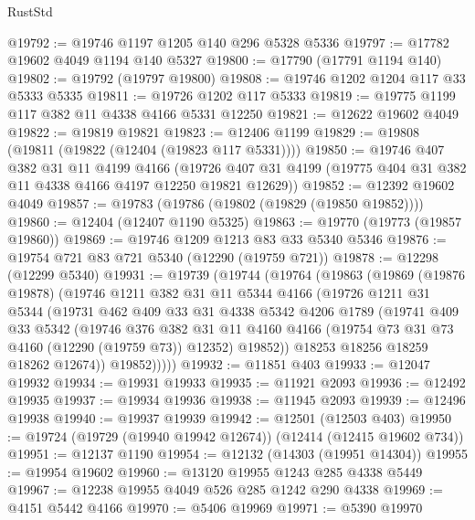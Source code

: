\begin{lexlean}{RustStd}
\begin{coremodule}
{\begin{coremodule}
{{{{{{{{{{{{{{{{{{{{{{{{{{{{{{{{{{{{{{{{{{{{{{{{{{@19792 := @19746 @1197 @1205 @140 @296 @5328 @5336
@19797 := @17782 @19602 @4049 @1194 @140 @5327
@19800 := @17790 (@17791 @1194 @140)
@19802 := @19792 (@19797 @19800)
@19808 := @19746 @1202 @1204 @117 @33 @5333 @5335
@19811 := @19726 @1202 @117 @5333
@19819 := @19775 @1199 @117 @382 @11 @4338 @4166 @5331 @12250
@19821 := @12622 @19602 @4049
@19822 := @19819 @19821
@19823 := @12406 @1199
@19829 := @19808 (@19811 (@19822 (@12404 (@19823 @117 @5331))))
@19850 := @19746
    @407
    @382
    @31
    @11
    @4199
    @4166
    (@19726 @407 @31 @4199 (@19775 @404 @31 @382 @11 @4338 @4166 @4197 @12250 @19821 @12629))
@19852 := @12392 @19602 @4049
@19857 := @19783 (@19786 (@19802 (@19829 (@19850 @19852))))
@19860 := @12404 (@12407 @1190 @5325)
@19863 := @19770 (@19773 (@19857 @19860))
@19869 := @19746 @1209 @1213 @83 @33 @5340 @5346
@19876 := @19754 @721 @83 @721 @5340 (@12290 (@19759 @721))
@19878 := @12298 (@12299 @5340)
@19931 := @19739
    (@19744
      (@19764
        (@19863
          (@19869
            (@19876 @19878)
            (@19746
              @1211
              @382
              @31
              @11
              @5344
              @4166
              (@19726
                @1211
                @31
                @5344
                (@19731
                  @462
                  @409
                  @33
                  @31
                  @4338
                  @5342
                  @4206
                  @1789
                  (@19741
                    @409
                    @33
                    @5342
                    (@19746
                      @376
                      @382
                      @31
                      @11
                      @4160
                      @4166
                      (@19754 @73 @31 @73 @4160 (@12290 (@19759 @73)) @12352)
                      @19852))
                  @18253
                  @18256
                  @18259
                  @18262
                  @12674))
              @19852)))))
@19932 := @11851 @403
@19933 := @12047 @19932
@19934 := @19931 @19933
@19935 := @11921 @2093
@19936 := @12492 @19935
@19937 := @19934 @19936
@19938 := @11945 @2093
@19939 := @12496 @19938
@19940 := @19937 @19939
@19942 := @12501 (@12503 @403)
@19950 := @19724 (@19729 (@19940 @19942 @12674)) (@12414 (@12415 @19602 @734))
@19951 := @12137 @1190
@19954 := @12132 (@14303 (@19951 @14304))
@19955 := @19954 @19602
@19960 := @13120 @19955 @1243 @285 @4338 @5449
@19967 := @12238 @19955 @4049 @526 @285 @1242 @290 @4338
@19969 := @4151 @5442 @4166
@19970 := @5406 @19969
@19971 := @5390 @19970
}}}}}}}}}}}}}}}}}}}}}}}}}}}}}}}}}}}}}}}}}}}}}}}}}}
\end{coremodule}}
\end{coremodule}
\end{lexlean}
